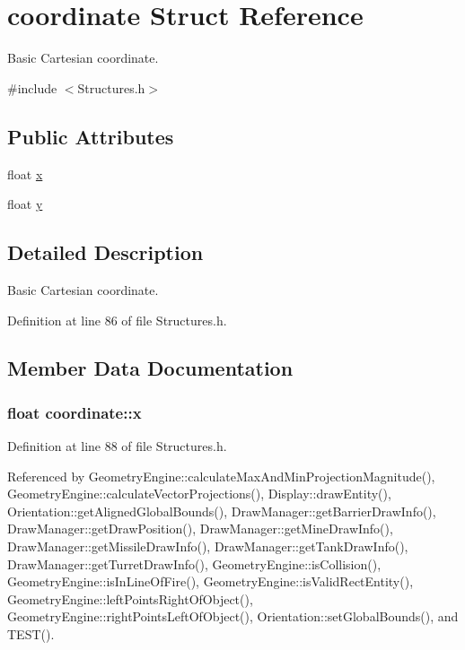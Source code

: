 \hypertarget{structcoordinate}{\section{coordinate Struct Reference}
\label{structcoordinate}
}


Basic Cartesian coordinate.  




{\ttfamily \#include $<$Structures.\-h$>$}

\subsection*{Public Attributes}
\begin{DoxyCompactItemize}
\item 
float \hyperlink{structcoordinate_acde0819ef9d30b7ce25b7d833d3df327}{x}
\item 
float \hyperlink{structcoordinate_ad48911206c84b1a8306a7023900ff622}{y}
\end{DoxyCompactItemize}


\subsection{Detailed Description}
Basic Cartesian coordinate. 

Definition at line 86 of file Structures.\-h.



\subsection{Member Data Documentation}
\hypertarget{structcoordinate_acde0819ef9d30b7ce25b7d833d3df327}{
\subsubsection[{x}]{\setlength{\rightskip}{0pt plus 5cm}float coordinate\-::x}}\label{structcoordinate_acde0819ef9d30b7ce25b7d833d3df327}


Definition at line 88 of file Structures.\-h.



Referenced by Geometry\-Engine\-::calculate\-Max\-And\-Min\-Projection\-Magnitude(), Geometry\-Engine\-::calculate\-Vector\-Projections(), Display\-::draw\-Entity(), Orientation\-::get\-Aligned\-Global\-Bounds(), Draw\-Manager\-::get\-Barrier\-Draw\-Info(), Draw\-Manager\-::get\-Draw\-Position(), Draw\-Manager\-::get\-Mine\-Draw\-Info(), Draw\-Manager\-::get\-Missile\-Draw\-Info(), Draw\-Manager\-::get\-Tank\-Draw\-Info(), Draw\-Manager\-::get\-Turret\-Draw\-Info(), Geometry\-Engine\-::is\-Collision(), Geometry\-Engine\-::is\-In\-Line\-Of\-Fire(), Geometry\-Engine\-::is\-Valid\-Rect\-Entity(), Geometry\-Engine\-::left\-Points\-Right\-Of\-Object(), Geometry\-Engine\-::right\-Points\-Left\-Of\-Object(), Orientation\-::set\-Global\-Bounds(), and T\-E\-S\-T().

